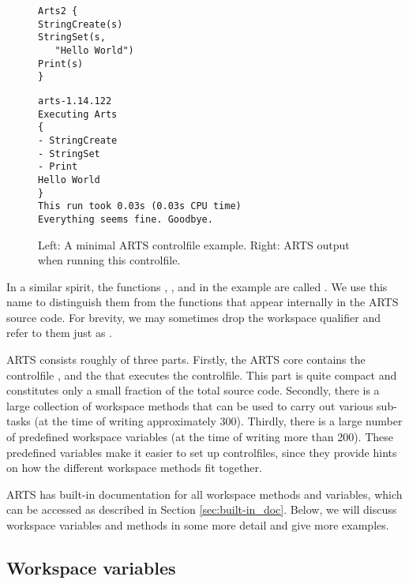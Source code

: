 \begin{figure}
\footnotesize
\begin{minipage}[t]{0.35\hsize}
\begin{lstlisting}
Arts2 {
StringCreate(s)
StringSet(s,
   "Hello World")
Print(s)
}
\end{lstlisting}
\end{minipage}
\hspace*{\fill}
\begin{minipage}[t]{0.5\hsize}
\begin{lstlisting}
arts-1.14.122
Executing Arts
{
- StringCreate
- StringSet
- Print
Hello World
}
This run took 0.03s (0.03s CPU time)
Everything seems fine. Goodbye.
\end{lstlisting}
\end{minipage}
\caption{Left: A minimal ARTS controlfile example. Right: ARTS output
  when running this controlfile. } 
\label{fig:hello}
\end{figure}

In a similar spirit, the functions ,
, and  in the example are called
\emph{}. We use this name to distinguish
them from the functions that appear internally in the ARTS source
code. For brevity, we may sometimes drop the workspace qualifier and
refer to them just as .

ARTS consists roughly of three parts. Firstly, the ARTS core contains the
controlfile , and the  that executes the controlfile. This part is
quite compact and constitutes only a small fraction of the total source code.
Secondly, there is a large collection of workspace methods that can be used to
carry out various sub-tasks (at the time of writing approximately 300).
Thirdly, there is a large number of predefined workspace variables (at the time
of writing more than 200). These predefined variables make it easier to set up
controlfiles, since they provide hints on how the different workspace methods
fit together.

ARTS has built-in documentation for all workspace methods and
variables, which can be accessed as described in Section
\ref{sec:built-in_doc}.  Below, we will discuss workspace variables
and methods in some more detail and give more examples.

\subsection{Workspace variables}

